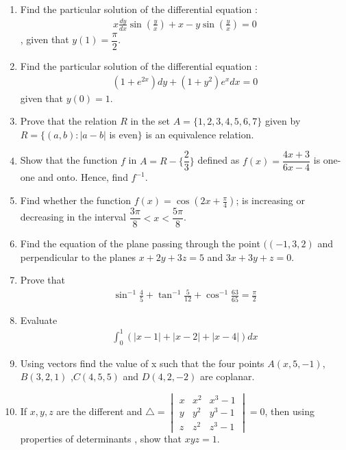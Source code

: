 \documentclass[12pt,-letter paper]{article}
\providecommand{\brak}[1]{\ensuremath{\left(#1\right)}}
\begin{document}
\begin{enumerate}
\item Find the particular solution of the differential equation :
	\begin{align*}
             x\frac{dy}{dx}\sin\brak{\frac{y}{x}}+x-y\sin\brak{\frac{y}{x}}=0
        \end{align*}, given that $y(1)=\dfrac{\pi}{2}$.
\item Find the particular solution of the differential equation :
	\begin{align*}
	      \brak{1+e^{2x}}dy+\brak{1+y^2}e^x dx=0
	\end{align*} given that $y(0)=1$.	

\item Prove that the relation $R$ in the set $A=\{1,2,3,4,5,6,7\}$ given by $R=\{(a,b) : |a-b|$ is even$\}$ is an equivalence relation.

\item Show that the function $f$ in $A=R-\{\dfrac{2}{3}\}$ defined as $f(x)=\dfrac{4x+3}{6x-4}$ is one-one and onto. Hence, find $f^{-1}$.
			
\item Find whether the function $f(x)=\cos\brak{2x+\frac{\pi}{4}}$; is increasing or decreasing in the interval $\dfrac{3\pi}{8}<x<\dfrac{5\pi}{8}$.

\item Find the equation of the plane passing through the point $(\brak{-1,3,2}$ and perpendicular to the planes $x+2y+3z=5$ and $3x+3y+z=0$.	

\item Prove that 
	\begin{align*}
		\sin^{-1}\frac{4}{5}+\tan^{-1}\frac{5}{12}+\cos^{-1}\frac{63}{65}=\frac{\pi}{2}
        \end{align*}

\item Evaluate 
	\begin{align*}\int_{0}^{1}\brak{|x-1|+|x-2|+|x-4|} dx\end{align*}

\item Using vectors find the value of x such that the four points $A\brak{x,5,-1}$, $B\brak{3,2,1}$ ,$C\brak{4,5,5}$ and $D\brak{4,2,-2}$ are coplanar.	

\item If $x,y,z$ are the different and $\triangle =\begin{vmatrix}    
		                                        x & x^2 & x^3-1\\
							y & y^2 & y^3-1\\
							z & z^2 & z^3-1
                                                   \end{vmatrix}=0$, then using properties of determinants , show that $xyz=1$.


\end{enumerate}
\end{document}
